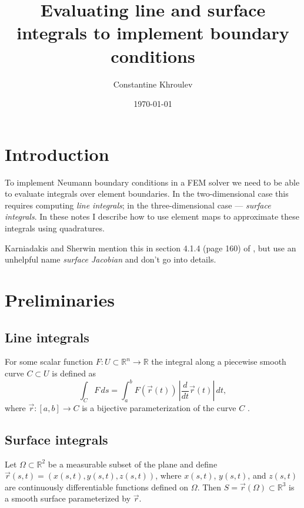 \documentclass[11pt]{article}
\author{Constantine Khroulev}
\date{\today}
\title{Evaluating line and surface integrals to implement boundary conditions}
\begin{document}
\maketitle
\tableofcontents

\newcommand{\dx}{\Delta x}
\newcommand{\dy}{\Delta y}
\newcommand{\Real}{\mathbb{R}}
\newcommand{\diff}[2]{\frac{\partial #1}{\partial #2}}
\newcommand{\rs}{\R_{s}}
\newcommand{\rt}{\R_{t}}
\newcommand{\R}{\vec r}
\newcommand{\N}{\vec n}
\newcommand{\rRef}{\R_{*}}

\section{Introduction}
\label{sec-1}

To implement Neumann boundary conditions in a FEM solver we need to be
able to evaluate integrals over element boundaries. In the
two-dimensional case this requires computing \emph{line integrals}; in
the three-dimensional case --- \emph{surface integrals}. In these
notes I describe how to use element maps to approximate these
integrals using quadratures.

Karniadakis and Sherwin mention this in section 4.1.4 (page 160) of
\cite{KarniadakisSherwin}, but use an unhelpful name \emph{surface
  Jacobian} and don't go into details.

\section{Preliminaries}
\label{sec-2}

\subsection{Line integrals}
\label{sec-2-1}

For some scalar function $F : U \subset \Real^{n} \to \Real$
the integral along a piecewise smooth curve $C \subset U$ is defined as
\begin{equation}
\label{eq:1}
\int_{C} F\, ds = \int_{a}^{b} F(\R(t))\, \left| \frac{d}{dt}\R(t) \right|\, dt,
\end{equation}
where $\R: [a, b] \to C$ is a bijective parameterization of the curve
$C$ \cite{Nikolsky1977}.

\subsection{Surface integrals}
\label{sec-2-2}

Let $\Omega \subset \Real^{2}$ be a measurable subset of the
plane and define $\R(s,t) = (x(s,t), y(s,t), z(s,t))$, where $x(s,
t)$, $y(s, t)$, and $z(s, t)$ are continuously differentiable
functions defined on $\Omega$. Then $S = \R(\Omega) \subset
\Real^{3}$ is a smooth surface parameterized by $\R$.
\end{document}
